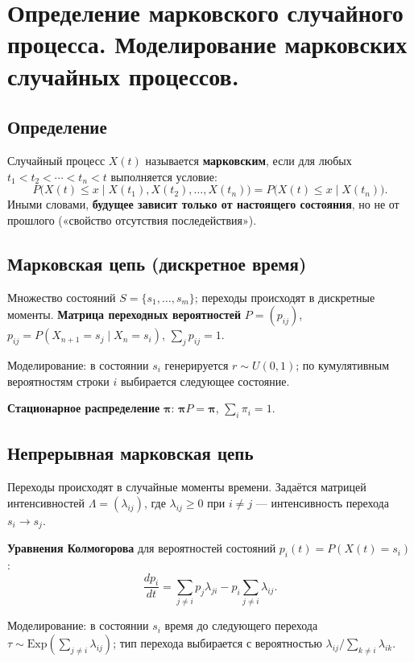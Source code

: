 \section{Определение марковского случайного процесса. Моделирование марковских случайных процессов.}

\subsection*{Определение}

Случайный процесс $X(t)$ называется \textbf{марковским}, если для любых $t_1 < t_2 < \cdots < t_n < t$ выполняется условие:
\[
  P\bigl(X(t) \leqslant x \mid X(t_1), X(t_2), \ldots, X(t_n)\bigr)
  = P\bigl(X(t) \leqslant x \mid X(t_n)\bigr).
\]
Иными словами, \textbf{будущее зависит только от настоящего состояния}, но не от прошлого («свойство отсутствия последействия»).

\subsection*{Марковская цепь (дискретное время)}

Множество состояний $S = \{s_1, \ldots, s_m\}$; переходы происходят в дискретные моменты.
\textbf{Матрица переходных вероятностей} $P = (p_{ij})$, $p_{ij} = P(X_{n+1}=s_j\mid X_n=s_i)$, $\sum_j p_{ij}=1$.

Моделирование: в состоянии $s_i$ генерируется $r \sim U(0,1)$; по кумулятивным вероятностям строки $i$ выбирается следующее состояние.

\textbf{Стационарное распределение} $\boldsymbol{\pi}$: $\boldsymbol{\pi}P = \boldsymbol{\pi}$, $\sum_i \pi_i = 1$.

\subsection*{Непрерывная марковская цепь}

Переходы происходят в случайные моменты времени. Задаётся матрицей интенсивностей $\Lambda = (\lambda_{ij})$, где $\lambda_{ij} \geqslant 0$ при $i \neq j$ — интенсивность перехода $s_i \to s_j$.

\textbf{Уравнения Колмогорова} для вероятностей состояний $p_i(t) = P(X(t)=s_i)$:
\[
  \frac{dp_i}{dt} = \sum_{j \neq i} p_j \lambda_{ji} - p_i \sum_{j \neq i} \lambda_{ij}.
\]

Моделирование: в состоянии $s_i$ время до следующего перехода $\tau \sim \mathrm{Exp}\!\left(\sum_{j\neq i}\lambda_{ij}\right)$; тип перехода выбирается с вероятностью $\lambda_{ij}/\sum_{k\neq i}\lambda_{ik}$.

\clearpage
